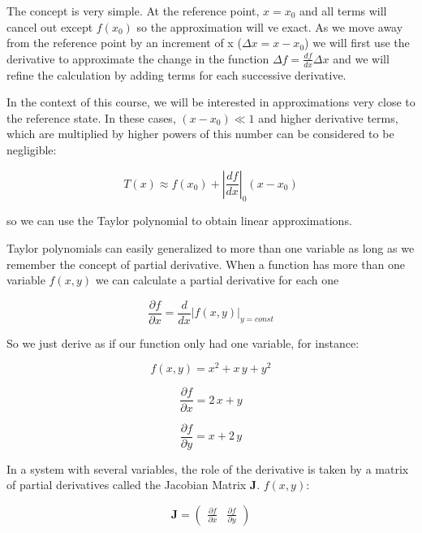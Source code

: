 \documentclass[12pt]{article}
\begin{document}
The concept is very simple. At the reference point, $x=x_0$ and all terms will cancel out except $f(x_0)$ so the approximation will ve exact. As we move away from the reference point by an increment of x ($\Delta x = x - x_0$) we will first use the derivative to approximate the change in the function $\Delta f= \frac{df}{dx}\Delta x$ and we will refine the calculation by adding terms for each successive derivative.

In the context of this course, we will be interested in approximations very close to the reference state. In these cases, $\left( x - x_0\right) \ll 1$ and higher derivative terms, which are multiplied by higher powers of this number can be considered to be negligible:

\begin{equation}
	\label{TaylorLin}
	T(x) \approx  f(x_0) + \left|\frac{df}{dx}\right|_0 \left( x - x_0\right)
\end{equation}

so we can use the Taylor polynomial to obtain  linear approximations.

Taylor polynomials can easily generalized to more than one variable as long as we remember the concept of partial derivative. When a function has more than one variable $f(x,y)$ we can calculate a partial derivative for each one

\begin{equation}
	\frac{\partial f}{\partial x} =\frac{d}{dx} \left| f(x,y) \right|_{y=const}  \nonumber
\end{equation}

So we just derive as if our function only had one variable, for instance:

\begin{equation}
	f(x,y) = x^2 + x \, y + y^2 \nonumber
\end{equation}


\begin{equation}
	\frac{\partial f}{\partial x} = 2 \, x + y \nonumber
\end{equation}

\begin{equation}
	\frac{\partial f}{\partial y} =  x + 2 \,y \nonumber
\end{equation}

In a system with several variables, the role of the derivative is taken by a matrix of partial derivatives called the Jacobian Matrix $\mathbf{J}$.  $f(x,y)$:

\begin{equation}
	\mathbf{J} = \begin{pmatrix} \frac{\partial f}{\partial x} & \frac{\partial f}{\partial y} \end{pmatrix} \nonumber
\end{equation}
\end{document}
